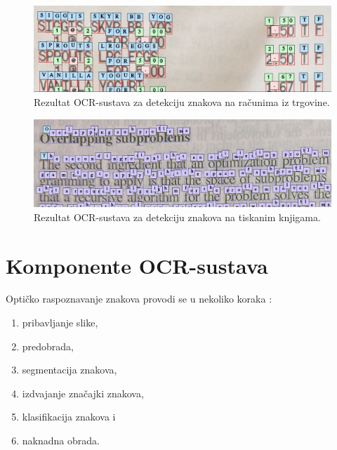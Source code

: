 \documentclass[times, utf8, zavrsni]{fer}
\begin{document}
\begin{figure}[htb]
    \centering
    \includegraphics[width=\textwidth]{images/receipt-example-01.png}
    \caption{Rezultat OCR-sustava za detekciju znakova na računima iz trgovine.}
    \label{fig:receipt-example-01}
\end{figure}

\begin{figure}[htb]
    \centering
    \includegraphics[width=\textwidth]{images/book-example-01.png}
    \caption{Rezultat OCR-sustava za detekciju znakova na tiskanim knjigama.}
    \label{fig:book-example-01}
\end{figure}

\pagebreak








\section{Komponente OCR-sustava}
\label{sec:komponente-ocr-sustava}
Optičko raspoznavanje znakova provodi se u nekoliko koraka
\citep{DBLP:journals/corr/abs-1710-05703} \citep{kaur2016survey}:

\begin{enumerate}
    \item pribavljanje slike,
    \item predobrada,
    \item segmentacija znakova,
    \item izdvajanje značajki znakova,
    \item klasifikacija znakova i
    \item naknadna obrada.
\end{enumerate}
\end{document}
